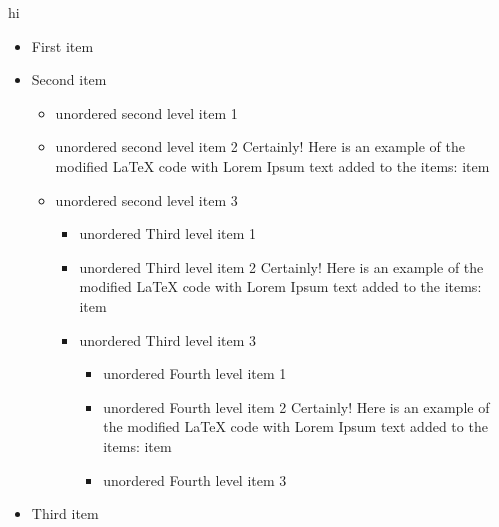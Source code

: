 hi
\begin{itemize}
    \item First item
    \item Second item
    \begin{itemize}
        \item unordered second level item 1
        \item unordered second level item 2 Certainly! Here is an example of the modified LaTeX code with Lorem Ipsum text
        added to the items: item
        \item unordered second level item 3
        \begin{itemize}
            \item unordered Third level item 1
            \item unordered Third level item 2 Certainly! Here is an example of the modified LaTeX code with Lorem Ipsum text
            added to the items: item
            \item unordered Third level item 3
            \begin{itemize}
                \item unordered Fourth level item 1
                \item unordered Fourth level item 2 Certainly! Here is an example of the modified LaTeX code with Lorem Ipsum text
                added to the items: item
                \item unordered Fourth level item 3
            \end{itemize}
        \end{itemize}
    \end{itemize}
    \item Third item
\end{itemize}
